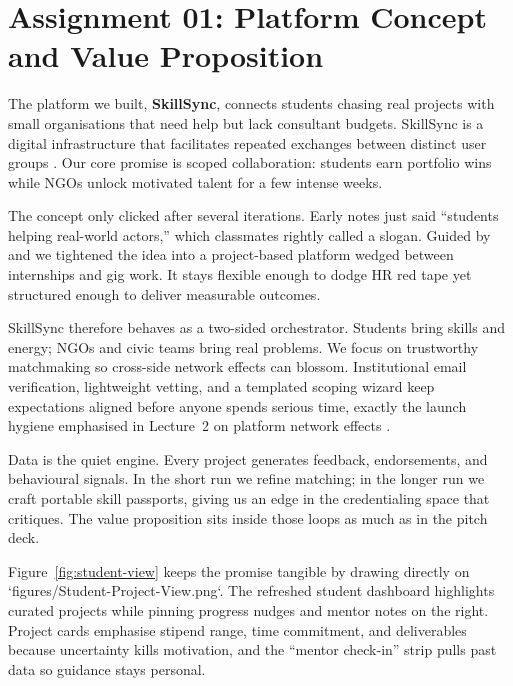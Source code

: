 \section*{Assignment 01: Platform Concept and Value Proposition}

The platform we built, \textbf{SkillSync}, connects students chasing real projects with small organisations that need help but lack consultant budgets. SkillSync is a digital infrastructure that facilitates repeated exchanges between distinct user groups \citep{Choudary2016}. Our core promise is scoped collaboration: students earn portfolio wins while NGOs unlock motivated talent for a few intense weeks.

The concept only clicked after several iterations. Early notes just said ``students helping real-world actors,'' which classmates rightly called a slogan. Guided by \citet{Choudary2016} and \citet{Srnicek2017} we tightened the idea into a project-based platform wedged between internships and gig work. It stays flexible enough to dodge HR red tape yet structured enough to deliver measurable outcomes.

SkillSync therefore behaves as a two-sided orchestrator. Students bring skills and energy; NGOs and civic teams bring real problems. We focus on trustworthy matchmaking so cross-side network effects can blossom. Institutional email verification, lightweight vetting, and a templated scoping wizard keep expectations aligned before anyone spends serious time, exactly the launch hygiene emphasised in Lecture~2 on platform network effects \citep{Lecture02}.

Data is the quiet engine. Every project generates feedback, endorsements, and behavioural signals. In the short run we refine matching; in the longer run we craft portable skill passports, giving us an edge in the credentialing space that \citet{Zuboff2019} critiques. The value proposition sits inside those loops as much as in the pitch deck.

Figure~\ref{fig:student-view} keeps the promise tangible by drawing directly on `figures/Student-Project-View.png`. The refreshed student dashboard highlights curated projects while pinning progress nudges and mentor notes on the right. Project cards emphasise stipend range, time commitment, and deliverables because uncertainty kills motivation, and the ``mentor check-in'' strip pulls past data so guidance stays personal.

